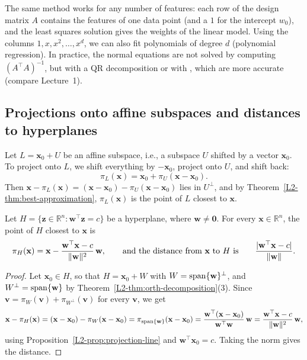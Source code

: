 \begin{remark}
    The same method works for any number of features: each row of the design matrix $A$ contains the features of one data point (and a $1$ for the intercept $w_0$), and the least squares solution gives the weights of the linear model. Using the columns $1, x, x^2, \ldots, x^d$, we can also fit polynomials of degree $d$ (polynomial regression). In practice, the normal equations are not solved by computing $(A^\top A)^{-1}$, but with a QR decomposition or with , which are more accurate (compare Lecture~1).
\end{remark}

\subsection{Projections onto affine subspaces and distances to hyperplanes}\label{L2-sec:affine}

Let $L = \mathbf{x}_0 + U$ be an affine subspace, i.e., a subspace $U$ shifted by a vector $\mathbf{x}_0$. To project onto $L$, we shift everything by $-\mathbf{x}_0$, project onto $U$, and shift back:
\[\pi_L(\mathbf{x}) = \mathbf{x}_0 + \pi_U(\mathbf{x} - \mathbf{x}_0).\]
Then $\mathbf{x} - \pi_L(\mathbf{x}) = (\mathbf{x} - \mathbf{x}_0) - \pi_U(\mathbf{x} - \mathbf{x}_0)$ lies in $U^\perp$, and by Theorem~\ref{L2-thm:best-approximation}, $\pi_L(\mathbf{x})$ is the point of $L$ closest to $\mathbf{x}$.

\begin{theorem}\label{L2-thm:distance-hyperplane}
    Let $H = \{\mathbf{z} \in \mathbb{R}^n : \mathbf{w}^\top \mathbf{z} = c\}$ be a hyperplane, where $\mathbf{w} \neq \mathbf{0}$. For every $\mathbf{x} \in \mathbb{R}^n$, the point of $H$ closest to $\mathbf{x}$ is
    \[\pi_H(\mathbf{x}) = \mathbf{x} - \frac{\mathbf{w}^\top \mathbf{x} - c}{\lVert \mathbf{w} \rVert^2}\, \mathbf{w}, \qquad \text{and the distance from } \mathbf{x} \text{ to } H \text{ is} \qquad \frac{|\mathbf{w}^\top \mathbf{x} - c|}{\lVert \mathbf{w} \rVert}.\]
\end{theorem}

\begin{proof}
    Let $\mathbf{x}_0 \in H$, so that $H = \mathbf{x}_0 + W$ with $W = \operatorname{span}\{\mathbf{w}\}^\perp$, and $W^\perp = \operatorname{span}\{\mathbf{w}\}$ by Theorem~\ref{L2-thm:orth-decomposition}(3). Since $\mathbf{v} = \pi_W(\mathbf{v}) + \pi_{W^\perp}(\mathbf{v})$ for every $\mathbf{v}$, we get
    \[\mathbf{x} - \pi_H(\mathbf{x}) = (\mathbf{x} - \mathbf{x}_0) - \pi_W(\mathbf{x} - \mathbf{x}_0) = \pi_{\operatorname{span}\{\mathbf{w}\}}(\mathbf{x} - \mathbf{x}_0) = \frac{\mathbf{w}^\top (\mathbf{x} - \mathbf{x}_0)}{\mathbf{w}^\top \mathbf{w}}\, \mathbf{w} = \frac{\mathbf{w}^\top \mathbf{x} - c}{\lVert \mathbf{w} \rVert^2}\, \mathbf{w},\]
    using Proposition~\ref{L2-prop:projection-line} and $\mathbf{w}^\top \mathbf{x}_0 = c$. Taking the norm gives the distance.
\end{proof}

